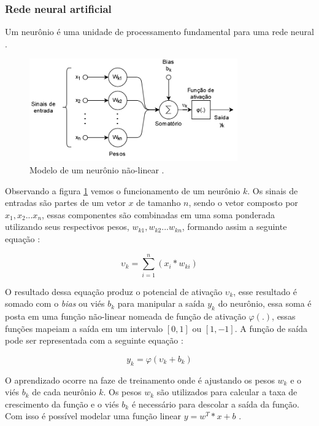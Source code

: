 \documentclass[
	12pt,				%
	openright,			%
	twoside,			%
	a4paper,			%
	english,			%
	french,				%
	spanish,			%
	brazil				%
	]{abntex2}
\begin{document}
\subsubsection{Rede neural artificial}

Um neurônio é uma unidade de processamento fundamental para uma rede neural \cite{haykin1999neural}.

\begin{figure}[H]
	\centering
	\includegraphics[width=0.8\textwidth]{figures/neuronio.png}
	\caption{Modelo de um neurônio não-linear \cite{haykin1999neural}.}
	\label{fig:neuronio}
\end{figure}

Observando a figura \ref{fig:neuronio} vemos o funcionamento de um neurônio $k$. Os sinais de entradas são partes de um vetor $x$ de tamanho $n$, sendo o vetor composto por $x_1, x_2 ... x_n$, essas componentes são combinadas em uma soma ponderada utilizando seus respectivos pesos, $w_{k1}, w_{k2}...w_{kn}$, formando assim a seguinte equação  :

$$\upsilon_k = \sum_{i=1}^n (x_i * w_{ki})$$

O resultado dessa equação produz o potencial de ativação $\upsilon_k$, esse resultado é somado com o \textit{bias} ou viés $b_k$ para manipular a saída $y_k$ do neurônio, essa soma é posta em uma função não-linear nomeada de função de ativação $\varphi(.)$, essas funções mapeiam a saída em um intervalo $[0, 1]$ ou $[1, -1]$. A função de saída pode ser representada com a seguinte equação :

$$y_k = \varphi(\upsilon_k + b_k)$$

O aprendizado ocorre na faze de treinamento onde é ajustando os pesos $w_k$ e o viés $b_k$ de cada neurônio $k$. Os pesos $w_k$ são utilizados para calcular a taxa de crescimento da função e o viés $b_k$ é necessário para descolar a saída da função. Com isso é possível modelar uma função linear $y=w^T*x+b$ \cite{marti2017aprendizado}.
\end{document}
